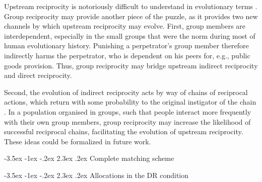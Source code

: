 \documentclass[12pt,a4paper]{article}\usepackage[]{graphicx}\usepackage[]{color}
\makeatletter
\renewcommand\section{\@startsection {section}{1}{\z@}%
{-3.5ex \@plus -1ex \@minus -.2ex}%
{2.3ex \@plus.2ex}%
{\bf\sffamily\Large}}
\makeatother
\begin{document}
Upstream reciprocity is notoriously difficult to understand in evolutionary
terms \citep{boyd1989evolution,nowak2007upstream}. Group reciprocity
may provide another piece of the puzzle, as it provides two new channels
by which upstream reciprocity may evolve. First, group members are
interdependent, especially in the small groups that were the norm
during most of human evolutionary history. Punishing a perpetrator's
group member therefore indirectly harms the perpetrator, who is dependent
on his peers for, e.g., public goods provision. Thus, group reciprocity
may bridge upstream indirect reciprocity and direct reciprocity.

Second, the evolution of indirect reciprocity acts by way of chains
of reciprocal actions, which return with some probability to the original
instigator of the chain \citep{nowak2007upstream}. In a population
organised in groups, such that people interact more frequently with
their own group members, group reciprocity may increase the likelihood
of successful reciprocal chains, facilitating the evolution of upstream
reciprocity. These ideas could be formalized in future work.



\newpage
\printbibliography
%
%

\newpage
\setcounter{figure}{0}
\setcounter{section}{0}
\renewcommand\thesection{Appendix~\Alph{section}:}
\renewcommand\thefigure{\Alph{section}.\arabic{figure}}  

\section{Complete matching scheme}
\begin{center}
\begin{sideways}\resizebox{0.9\textheight}{!}{



}
\end{sideways}
\end{center}

\newpage
\section{Allocations in the DR condition}
\end{document}
